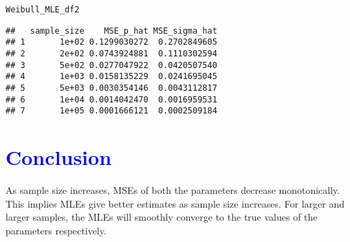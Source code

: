 \documentclass[11pt, a4paper]{article}\usepackage[]{graphicx}\usepackage[]{xcolor}
\makeatletter
\newcommand{\hldef}[1]{\textcolor[rgb]{0.345,0.345,0.345}{#1}}%
\newenvironment{kframe}{%
 \def\at@end@of@kframe{}%
 \ifinner\ifhmode%
  \def\at@end@of@kframe{\end{minipage}}%
  \begin{minipage}{\columnwidth}%
 \fi\fi%
 \def\FrameCommand##1{\hskip\@totalleftmargin \hskip-\fboxsep
 \colorbox{shadecolor}{##1}\hskip-\fboxsep
     \hskip-\linewidth \hskip-\@totalleftmargin \hskip\columnwidth}%
 \MakeFramed {\advance\hsize-\width
   \@totalleftmargin\z@ \linewidth\hsize
   \@setminipage}}%
 {\par\unskip\endMakeFramed%
 \at@end@of@kframe}
\newenvironment{knitrout}{}{} %
\makeatother
\begin{document}
\begin{knitrout}
\color{fgcolor}\begin{kframe}
\begin{alltt}
\hldef{Weibull_MLE_df2}
\end{alltt}
\begin{verbatim}
##   sample_size    MSE_p_hat MSE_sigma_hat
## 1       1e+02 0.1299030272  0.2702849605
## 2       2e+02 0.0743924881  0.1110302594
## 3       5e+02 0.0277047922  0.0420507540
## 4       1e+03 0.0158135229  0.0241695045
## 5       5e+03 0.0030354146  0.0043112817
## 6       1e+04 0.0014042470  0.0016959531
## 7       1e+05 0.0001666121  0.0002509184
\end{verbatim}
\end{kframe}
\end{knitrout}


\section*{\faArrowAltCircleRight[regular] \textcolor{blue}{Conclusion}}

\smallpencil \hspace{0.3cm} {\setlength{\spaceskip}{1em plus 0.5em minus 0.5em} \fontsize{17}{20}\myfont As sample size increases, MSEs of both the parameters decrease monotonically. This implies MLEs give better estimates as sample size increases. For larger and larger samples, the MLEs will smoothly converge to the true values of the parameters respectively. \par}
\end{document}
